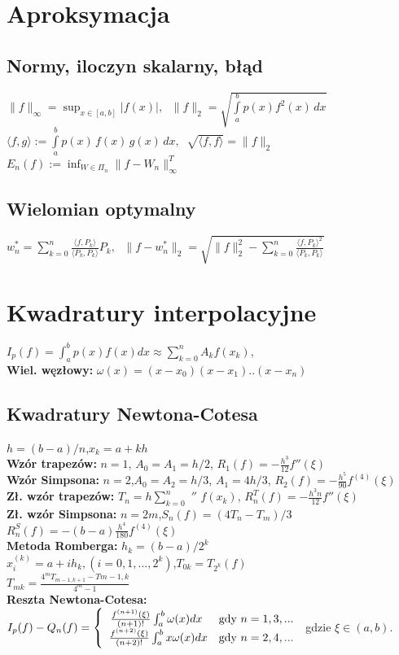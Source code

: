\documentclass[a4paper,twocolumn]{article}
\begin{document}
\section{Aproksymacja}

\subsection{Normy, iloczyn skalarny, błąd}
$\|f\|_\infty = \sup_{x \in [a,b]}|f(x)|,\;$
$\|f\|_2 = \sqrt{\int\limits_a^b p(x)f^2(x)\,dx}$\\
$\langle f, g \rangle := \int\limits_a^b p(x)\,f(x)\,g(x)\,dx,\;\; \sqrt{\langle f, f \rangle} = \|f\|_2$\\
$E_n(f) := \inf_{W \in \Pi_n} \|f-W_n\|_\infty^T$

\subsection{Wielomian optymalny}

$w_n^* = \sum_{k=0}^n \frac{\langle f, P_k \rangle}{\langle P_k, P_k \rangle} P_k,\;$
$\|f-w_n^*\|_2 = \sqrt{\|f\|_2^2 - \sum_{k=0}^n \frac{{\langle f, P_k \rangle}^2}{\langle P_k, P_k \rangle}}$

\section{Kwadratury interpolacyjne}
\noindent $I_p(f) = \int_{a}^{b}p(x)f(x)dx \approx \sum_{k=0}^{n}A_kf(x_k)$, \\
\textbf{Wiel. węzłowy:} $\omega(x) = (x-x_0)(x-x_1)..(x-x_n)$

\subsection{Kwadratury Newtona-Cotesa}
$h=(b-a)/n$,\quad $x_k=a+kh$\\
\textbf{Wzór trapezów:}  $n=1$, $A_0=A_1=h/2$, $R_1(f)=-\frac{h^3}{12}f''(\xi)$\\
\textbf{Wzór Simpsona:} $n=2$,$A_0=A_2=h/3$, $A_1=4h/3$, $R_2(f)=-\frac{h^5}{90}f^{(4)}(\xi)$\\
\textbf{Zł. wzór trapezów:} $T_n=h\sum_{k=0}^{n}$ $''$ $f(x_k)$,
$R_n^T(f)=-\frac{h^3n}{12}f''(\xi)$\\
\textbf{Zł. wzór Simpsona:} $n=2m$,\quad $S_n(f)=(4T_n-T_m)/3$\\
$R_n^S(f)=-(b-a)\frac{h^4}{180}f^{(4)}(\xi)$\\
\textbf{Metoda Romberga:} $h_k=(b-a)/2^k$\\
$x_i^(k)=a+ih_k,(i=0,1,\dots,2^k)$,\quad $T_{0k}=T_{2^k}(f)$\\
$T_{mk}=\frac{4^mT_{m-1,k+1} - T{m-1,k}}{4^m-1}$\\
\textbf{Reszta Newtona-Cotesa:} \\
\noindent$  I_p(f) - Q_n(f) = \left\{ \begin{array}{ll}
\left.\frac{f^{(n+1)}(\xi)}{(n+1)!}\int_{a}^{b} \omega(x) dx
\right. & \textrm{gdy $ n = 1,3,... $}\\
\frac{f^{(n+2)}(\xi)}{(n+2)!}\int_{a}^{b} x\omega(x) dx & \textrm{gdy $ n = 2,4,... $}
\end{array} \right.
$
gdzie $\xi \in (a, b).$
\end{document}
